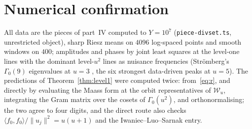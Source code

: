 \documentclass[11pt,a4paper]{article}
\theoremstyle{remark}\newtheorem{remark}[theorem]{Remark}
\begin{document}
\section{Numerical confirmation}\label{sec:numerics}

All data are the pieces of part~IV computed to $Y=10^7$ (\texttt{piece-divset.ts}, unrestricted object), sharp Riesz means
on $4096$ log-spaced points and smooth windows on $400$; amplitudes and phases by joint least squares at the level-one
lines with the dominant level-$u^2$ lines as nuisance frequencies (Str\"omberg's $\Gamma_0(9)$ eigenvalues at $u=3$
\cite{Stromberg2012}, the six strongest data-driven peaks at $u=5$). The predictions of Theorem~\ref{thm:level1} were
computed twice: from~\eqref{eq:r}, and directly by evaluating the Maass form at the orbit representatives of $\mathcal W_u$,
integrating the Gram matrix over the cosets of $\Gamma_0(u^2)$, and orthonormalising; the two agree to four digits, and
the direct route also checks $\langle f_0,f_0\rangle/\|u_j\|^2=u(u+1)$ and the Iwaniec--Luo--Sarnak entry.
\end{document}
